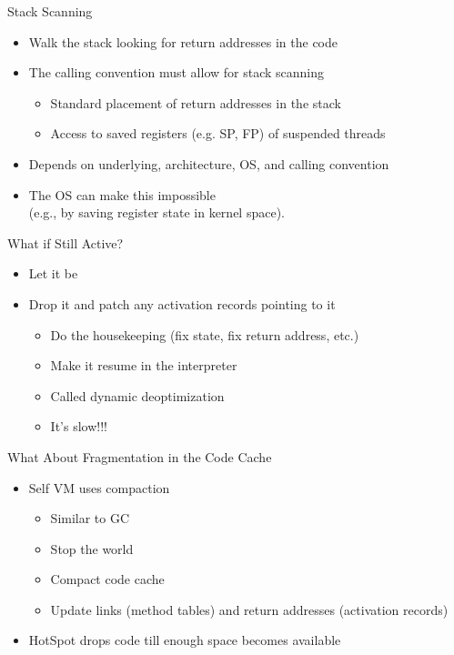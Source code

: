 \documentclass[
14pt,
aspectratio=169,
usenames,
dvipsnames,
x11names]{beamer}
\begin{document}
\begin{frame}{Stack Scanning}
  \begin{itemize}  \setlength{\itemsep}{\fill}
  \item \alert{Walk the stack} looking for return addresses in the code
  \item The \alert{calling convention} must allow for stack scanning
    \begin{itemize}
    \item Standard placement of return addresses in the stack
    \item Access to saved registers (e.g. SP, FP) of suspended threads
    \end{itemize}
  \item Depends on underlying, architecture, OS, and calling convention
  \item The OS can make this \alert{impossible}\\
    (e.g., by saving register state in kernel space).
  \end{itemize}
\end{frame}

\begin{frame}{What if Still Active?}
  \begin{itemize}  \setlength{\itemsep}{\fill}
  \item Let it be
  \item Drop it and patch any activation records pointing to it
    \begin{itemize}
    \item Do the housekeeping (fix state, fix return address, etc.)
    \item Make it resume in the interpreter
    \item Called \alert{dynamic deoptimization}
    \item It's slow!!!
    \end{itemize}
  \end{itemize}
\end{frame}

\begin{frame}{What About Fragmentation in the Code Cache}
  \begin{itemize}  \setlength{\itemsep}{\fill}
  \item Self VM uses \alert{compaction}
    \begin{itemize}
    \item Similar to GC
    \item Stop the world
    \item Compact code cache
    \item Update links (method tables) and return addresses (activation records)
    \end{itemize}
  \item HotSpot\texttrademark{} drops code till enough space becomes available
  \end{itemize}
\end{frame}
\end{document}

